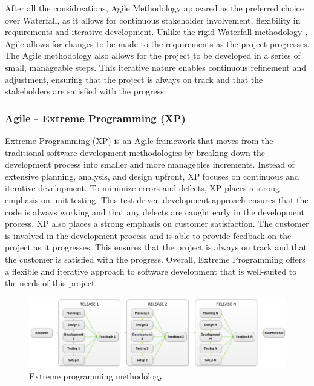 After all the considreations, Agile Methodology \cite{despa2014comparative} appeared as the preferred choice over Waterfall, as it allows for continuous stakeholder involvement, flexibility in requirements and iterative development.
Unlike the rigid Waterfall methodology \cite{despa2014comparative}, Agile allows for changes to be made to the requirements as the project progresses. The Agile methodology also allows for the project to be developed in a series of small, manageable steps.
This iterative nature enables continuous refinement and adjustment, ensuring that the project is always on track and that the stakeholders are satisfied with the progress.

\subsubsection*{Agile - Extreme Programming (XP)}
Extreme Programming (XP) is an Agile framework that moves from the traditional software development methodologies by breaking down the development process into smaller and more managebles increments.
Instead of extensive planning, analysis, and design upfront, XP focuses on continuous and iterative development. To minimize errors and defects, XP places a strong emphasis on unit testing.
This test-driven development approach ensures that the code is always working and that any defects are caught early in the development process.
XP also places a strong emphasis on customer satisfaction. The customer is involved in the development process and is able to provide feedback on the project as it progresses. This ensures that the project is always on track and that the customer 
is satisfied with the progress. \cite{despa2014comparative} 
Overall, Extreme Programming offers a flexible and iterative approach to software development that is well-suited to the needs of this project. 

\begin{figure}
    \centering
    \includegraphics[width=1.0\linewidth]{images/xp.png}
    \caption{Extreme programming methodology \cite{despa2014comparative}}
    \label{fig:agile}
\end{figure}

